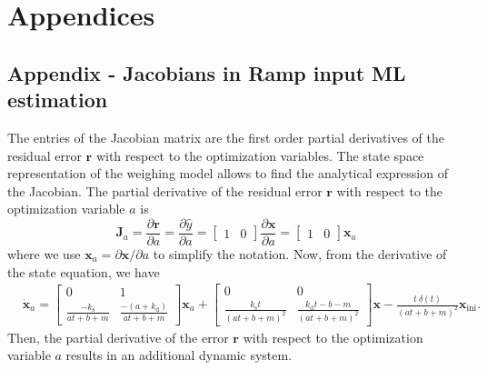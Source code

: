 \glsresetall

\chapter{Appendices }\label{chap:Appendices}
\vfill{}


 
 
\section{Appendix - Jacobians in Ramp input ML estimation}


The entries of the Jacobian matrix are the first order partial derivatives of the residual error $\mathbf{r}$ with respect to the optimization variables.
The state space representation of the weighing model allows to find the analytical expression of the Jacobian.
The partial derivative of the residual error $\mathbf{r}$ with respect to the optimization variable $a$ is 
\begin{equation} \mathbf{J}_a=\dfrac{\partial \mathbf{r}}{\partial a} = \dfrac{\partial \widehat{y}}{\partial a} = \begin{bmatrix} 1 & 0  \end{bmatrix} \dfrac{\partial \mathbf{x}}{\partial a} = \begin{bmatrix} 1 & 0  \end{bmatrix} \mathbf{x}_a \end{equation}
where we use $\mathbf{x}_a = \partial \mathbf{x}/ \partial a$ to simplify the notation. 
Now, from the derivative of the state equation, we have
\begin{equation} \begin{aligned} 
    & \dot{\mathbf{x}}_a = \begin{bmatrix} 0 & 1 \\ \frac{-k_{\mathrm{s}}}{a t + b + m} & \frac{-(a + k_{\mathrm{d}})}{a t + b + m} \end{bmatrix} \mathbf{x}_a 
    + \begin{bmatrix} 0 & 0 \\ \frac{k_{\mathrm{s}} t}{(a t + b + m)^2} & \frac{k_{\mathrm{d}} t - b - m}{(a t + b + m)^2} \end{bmatrix} \mathbf{x} 
    - \frac{t \ \delta(t)}{(a t + b + m)^2} \mathbf{x}_{\text{ini}}   . 
\end{aligned} \end{equation}
Then, the partial derivative of the error $\mathbf{r}$ with respect to the optimization variable $a$ results in an additional dynamic system.

